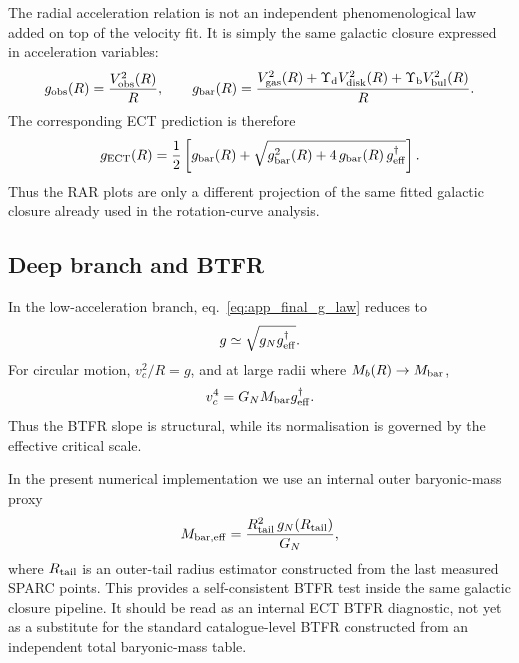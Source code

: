 \documentclass[11pt,a4paper]{article}
\numberwithin{equation}{section}
\begin{document}
The radial acceleration relation is not an independent phenomenological
law added on top of the velocity fit.  It is simply the same galactic
closure expressed in acceleration variables:
\begin{equation}
g_{\rm obs}(R)=\frac{V_{\rm obs}^2(R)}{R},
\qquad
g_{\rm bar}(R)=\frac{V_{\rm gas}^2(R)+\Upsilon_{\rm d}V_{\rm disk}^2(R)+
\Upsilon_{\rm b}V_{\rm bul}^2(R)}{R}.
\end{equation}
The corresponding ECT prediction is therefore
\begin{equation}
g_{\rm ECT}(R)=\frac{1}{2}\left[g_{\rm bar}(R)+
\sqrt{g_{\rm bar}^2(R)+4\,g_{\rm bar}(R)\,g^\dagger_{\rm eff}}\right].
\label{eq:app_rar_ect}
\end{equation}
Thus the RAR plots are only a different projection of the same fitted
galactic closure already used in the rotation-curve analysis.

\subsection{Deep branch and BTFR}

In the low-acceleration branch, eq.~\eqref{eq:app_final_g_law}
reduces to
\begin{equation}
g \simeq \sqrt{g_N g^\dagger_{\rm eff}}.
\end{equation}
For circular motion, $v_c^2/R=g$, and at large radii where
$M_b(R)\to M_{\rm bar}$,
\begin{equation}
v_c^4 = G_N M_{\rm bar} g^\dagger_{\rm eff}.
\label{eq:app_btfr_again}
\end{equation}
Thus the BTFR slope is structural, while its normalisation is governed
by the effective critical scale.

In the present numerical implementation we use an internal outer
baryonic-mass proxy
\begin{equation}
M_{\rm bar,eff}
=
\frac{R_{\rm tail}^2\,g_N(R_{\rm tail})}{G_N},
\label{eq:app_btfr_proxy_mass}
\end{equation}
where $R_{\rm tail}$ is an outer-tail radius estimator constructed from
the last measured SPARC points.  This provides a self-consistent BTFR
test inside the same galactic closure pipeline.  It should be read as an
internal ECT BTFR diagnostic, not yet as a substitute for the standard
catalogue-level BTFR constructed from an independent total baryonic-mass
table.


\end{document}
